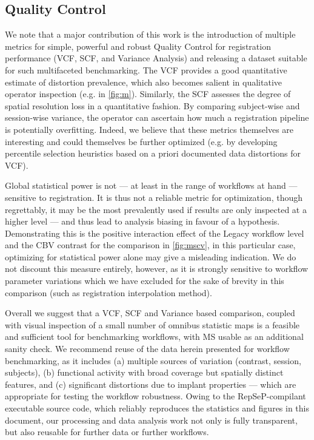 \subsection{Quality Control}

We note that a major contribution of this work is the introduction of multiple metrics for simple, powerful and robust Quality Control for registration performance (VCF, SCF, and Variance Analysis) and releasing a dataset suitable for such multifaceted benchmarking.
The VCF provides a good quantitative estimate of distortion prevalence, which also becomes salient in qualitative operator inspection (e.g. in \cref{fig:m}).
Similarly, the SCF assesses the degree of spatial resolution loss in a quantitative fashion.
By comparing subject-wise and session-wise variance, the operator can ascertain how much a registration pipeline is potentially overfitting.
Indeed, we believe that these metrics themselves are interesting and could themselves be further optimized (e.g. by developing percentile selection heuristics based on a priori documented data distortions for VCF).

Global statistical power is not --- at least in the range of workflows at hand --- sensitive to registration.
It is thus not a reliable metric for optimization, though regrettably, it may be the most prevalently used if results are only inspected at a higher level --- and thus lead to analysis biasing in favour of a hypothesis.
Demonstrating this is the positive interaction effect of the Legacy workflow level and the CBV contrast for the comparison in \cref{fig:mscv}, in this particular case, optimizing for statistical power alone may give a misleading indication.
We do not discount this measure entirely, however, as it is strongly sensitive to workflow parameter variations which we have excluded for the sake of brevity in this comparison (such as registration interpolation method).

Overall we suggest that a VCF, SCF and Variance based comparison, coupled with visual inspection of a small number of omnibus statistic maps is a feasible and sufficient tool for benchmarking workflows, with MS usable as an additional sanity check.
We recommend reuse of the data herein presented for workflow benchmarking, as it includes (a) multiple sources of variation (contrast, session, subjects), (b) functional activity with broad coverage but spatially distinct features, and (c) significant distortions due to implant properties --- which are appropriate for testing the workflow robustness.
Owing to the RepSeP-compilant executable source code, which reliably reproduces the statistics and figures in this document, our processing and data analysis work not only is fully transparent, but also reusable for further data or further workflows.

